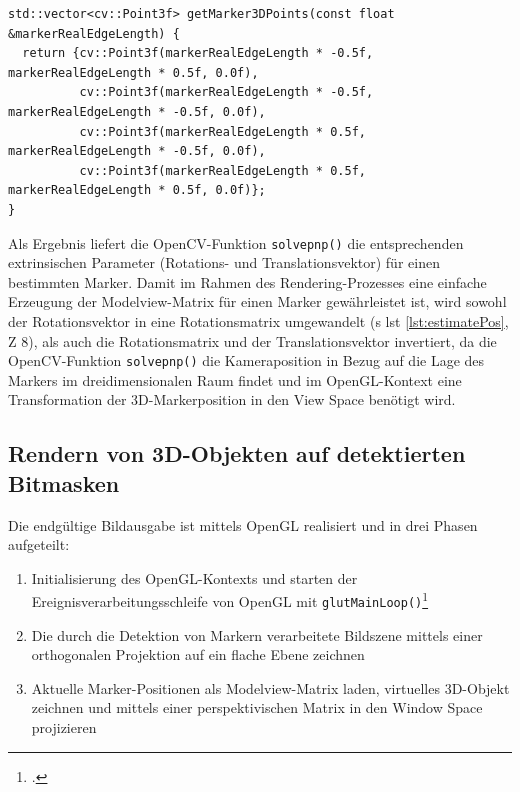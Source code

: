 \begin{lstlisting}[caption={Die Funktion \texttt{detectormarkerbased.cpp/getMarker3DPoints();} bestimmt die Position eines Markers im dreidimensionalen Raum}, label={lst:getMarker3DPoints}]
std::vector<cv::Point3f> getMarker3DPoints(const float &markerRealEdgeLength) {
  return {cv::Point3f(markerRealEdgeLength * -0.5f, markerRealEdgeLength * 0.5f, 0.0f),
          cv::Point3f(markerRealEdgeLength * -0.5f, markerRealEdgeLength * -0.5f, 0.0f),
          cv::Point3f(markerRealEdgeLength * 0.5f, markerRealEdgeLength * -0.5f, 0.0f),
          cv::Point3f(markerRealEdgeLength * 0.5f, markerRealEdgeLength * 0.5f, 0.0f)};
}
\end{lstlisting}

\noindent Als Ergebnis liefert die OpenCV-Funktion \texttt{solvepnp()} die entsprechenden extrinsischen Parameter (Rotations- und Translationsvektor) für einen bestimmten Marker. Damit im Rahmen des Rendering-Prozesses eine einfache Erzeugung der Modelview-Matrix für einen Marker gewährleistet ist, wird sowohl der Rotationsvektor in eine Rotationsmatrix umgewandelt (\acs{s} \acs{lst} \ref{lst:estimatePos}, \acs{Z} 8), als auch die Rotationsmatrix und der Translationsvektor invertiert, da die OpenCV-Funktion \texttt{solvepnp()} die Kameraposition in Bezug auf die Lage des Markers im dreidimensionalen Raum findet und im OpenGL-Kontext eine Transformation der 3D-Markerposition in den View Space benötigt wird.

\subsection{Rendern von 3D-Objekten auf detektierten Bitmasken}
Die endgültige Bildausgabe ist mittels OpenGL realisiert und in drei Phasen aufgeteilt:

\begin{enumerate}
\item Initialisierung des OpenGL-Kontexts und starten der Ereignisverarbeitungsschleife von OpenGL mit \texttt{glutMainLoop()}\footcite{openglglutMainLoop}
\item Die durch die Detektion von Markern verarbeitete Bildszene mittels einer orthogonalen Projektion auf ein flache Ebene zeichnen
\item Aktuelle Marker-Positionen als Modelview-Matrix laden, virtuelles 3D-Objekt zeichnen und mittels einer perspektivischen Matrix in den Window Space projizieren
\end{enumerate}

